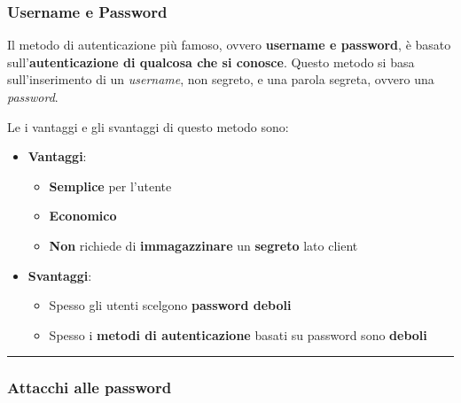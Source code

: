 \documentclass[a4paper]{article}
\newcommand{\longline}{\noindent\rule{\textwidth}{0.4pt}}
\begin{document}
	\subsubsection{Username e Password}
	
	Il metodo di autenticazione più famoso, ovvero \textcolor{Red3}{\textbf{username e password}}, è basato sull'\textbf{autenticazione di qualcosa che si conosce}. Questo metodo si basa sull'inserimento di un \emph{username}, non segreto, e una parola segreta, ovvero una \emph{password}.\newline
	
	\noindent
	Le i vantaggi e gli svantaggi di questo metodo sono:
	\begin{itemize}
		\item \textcolor{Green4}{\textbf{Vantaggi}}:
		\begin{itemize}
			\item \textbf{Semplice} per l'utente
			
			\item \textbf{Economico}
			
			\item \textbf{Non} richiede di \textbf{immagazzinare} un \textbf{segreto} lato client
		\end{itemize}
		
		\item \textcolor{Red3}{\textbf{Svantaggi}}:
		\begin{itemize}
			\item Spesso gli utenti scelgono \textbf{password deboli}
			
			\item Spesso i \textbf{metodi di autenticazione} basati su password sono \textbf{deboli}
		\end{itemize}
	\end{itemize}
	
	\longline
	
	\subsubsection{Attacchi alle password}
	
\end{document}
